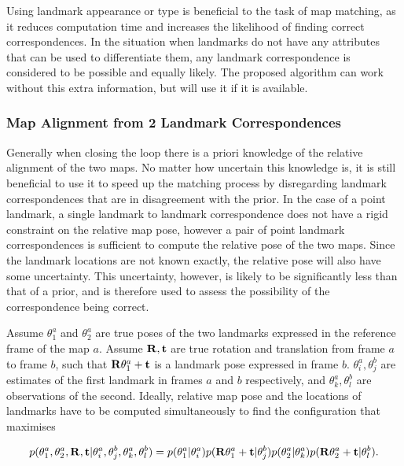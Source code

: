 Using landmark appearance or type is beneficial to the task of map
matching, as it reduces computation time and increases the likelihood
of finding correct correspondences. In the situation when landmarks do
not have any attributes that can be used to differentiate them, any
landmark correspondence is considered to be possible and equally
likely. The proposed algorithm can work without this extra
information, but will use it if it is available.


\subsubsection{Map Alignment from 2 Landmark Correspondences}

Generally when closing the loop there is a priori knowledge of the
relative alignment of the two maps. No matter how uncertain this
knowledge is, it is still beneficial to use it to speed up the
matching process by disregarding landmark correspondences that are in
disagreement with the prior. In the case of a point landmark, a single
landmark to landmark correspondence does not have a rigid constraint
on the relative map pose, however a pair of point landmark
correspondences is sufficient to compute the relative pose of the two
maps. Since the landmark locations are not known exactly, the relative
pose will also have some uncertainty. This uncertainty, however, is
likely to be significantly less than that of a prior, and is therefore
used to assess the possibility of the correspondence being
correct.

Assume $\theta^a_1$ and $\theta^a_2$ are true poses of the two
landmarks expressed in the reference frame of the map $a$. Assume
${\bf R,t}$ are true rotation and translation from frame $a$ to frame
$b$, such that ${\bf R}\theta_1^a + \bf{t}$ is a landmark pose expressed
in frame $b$. $\theta^a_i, \theta^b_j$ are estimates of the first
landmark in frames $a$ and $b$ respectively, and $\theta^a_k,
\theta^b_l$ are observations of the second. Ideally, relative map
pose and the locations of landmarks have to be computed
simultaneously to find the configuration that maximises

\begin{equation}
p(\theta^a_1, \theta^a_2, {\bf R},{\bf t}|
  \theta^a_i, \theta^b_j, \theta^a_k, \theta^b_l) =
p(\theta^a_1 | \theta^a_i)
p({\bf R}\theta^a_1+{\bf t} | \theta^b_j)
p(\theta^a_2 | \theta^a_k)
p({\bf R}\theta^a_2+{\bf t} | \theta^b_l).
\label{eqn:true_alignment_prob}
\end{equation}

